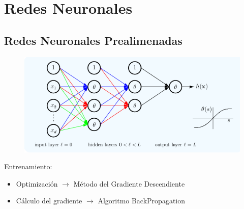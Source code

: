 \section{Redes Neuronales}


\subsection{Redes Neuronales Prealimenadas}




\begin{frame}


    \begin{figure}
        \hspace*{-1cm}   
        \includegraphics[keepaspectratio=true,height=1\paperheight,width=0.99\linewidth]{Images/grafo RRNN.png}
    \end{figure}
    
    Entrenamiento: 
    \begin{itemize}
        \item Optimización $\rightarrow$ Método del Gradiente Descendiente
        \item Cálculo del gradiente $\rightarrow$ Algoritmo BackPropagation
    \end{itemize}

\end{frame}



